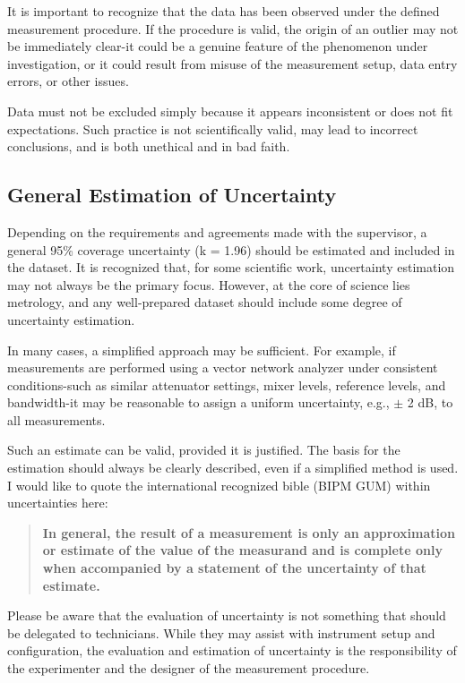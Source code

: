 It is important to recognize that the data has been observed under the defined measurement procedure. If the procedure is valid, the origin of an outlier may not be immediately clear-it could be a genuine feature of the phenomenon under investigation, or it could result from misuse of the measurement setup, data entry errors, or other issues.

Data must not be excluded simply because it appears inconsistent or does not fit expectations. Such practice is not scientifically valid, may lead to incorrect conclusions, and is both unethical and in bad faith.

\subsection{General Estimation of Uncertainty}
Depending on the requirements and agreements made with the supervisor, a general 95\% coverage uncertainty (k = 1.96) should be estimated and included in the dataset. It is recognized that, for some scientific work, uncertainty estimation may not always be the primary focus. However, at the core of science lies metrology, and any well-prepared dataset should include some degree of uncertainty estimation.

In many cases, a simplified approach may be sufficient. For example, if measurements are performed using a vector network analyzer under consistent conditions-such as similar attenuator settings, mixer levels, reference levels, and bandwidth-it may be reasonable to assign a uniform uncertainty, e.g., $\pm$ 2 dB, to all measurements.

Such an estimate can be valid, provided it is justified. The basis for the estimation should always be clearly described, even if a simplified method is used. I would like to quote the international recognized bible (BIPM GUM) within uncertainties here:

\begin{quote}
\centering
\textbf{In general, the result of a measurement is only an approximation or estimate of the value of the measurand and is complete only when accompanied by a statement of the uncertainty of that estimate.}
\end{quote}

Please be aware that the evaluation of uncertainty is not something that should be delegated to technicians. While they may assist with instrument setup and configuration, the evaluation and estimation of uncertainty is the responsibility of the experimenter and the designer of the measurement procedure.

